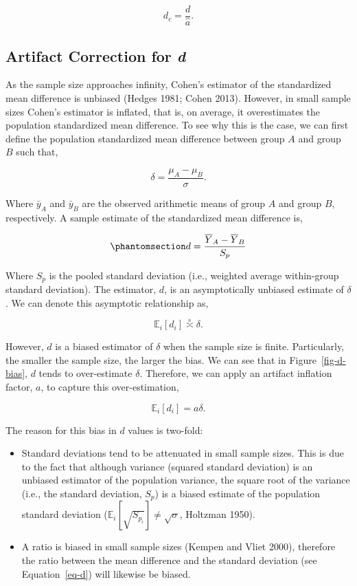 \documentclass[
  letterpaper,
  DIV=11,
  numbers=noendperiod]{scrreprt}
\providecommand{\tightlist}{%
  \setlength{\itemsep}{0pt}\setlength{\parskip}{0pt}}\usepackage{longtable,booktabs,array}
\begin{document}
\[
d_c = \frac{d}{\hat{a}}.
\]

\subsection{\texorpdfstring{Artifact Correction for
\emph{d}}{Artifact Correction for d}}\label{artifact-correction-for-d}

As the sample size approaches infinity, Cohen's estimator of the
standardized mean difference is unbiased (Hedges 1981; Cohen 2013).
However, in small sample sizes Cohen's estimator is inflated, that is,
on average, it overestimates the population standardized mean
difference. To see why this is the case, we can first define the
population standardized mean difference between group \(A\) and group
\(B\) such that,

\[
\delta = \frac{\mu_A-\mu_B}{\sigma}.
\]

Where \(\bar{y}_A\) and \(\bar{y}_B\) are the observed arithmetic means
of group \(A\) and group \(B\), respectively. A sample estimate of the
standardized mean difference is,

\begin{equation}\phantomsection\label{eq-d}{
d = \frac{\overline{Y}_A-\overline{Y}_B}{S_p}
}\end{equation}

Where \(S_p\) is the pooled standard deviation (i.e., weighted average
within-group standard deviation). The estimator, \(d\), is an
asymptotically unbiased estimate of \(\delta\). We can denote this
asymptotic relationship as,

\[
\mathbb{E}_i[d_i] \overset{_n}{\asymp} \delta.
\]

However, \(d\) is a biased estimator of \(\delta\) when the sample size
is finite. Particularly, the smaller the sample size, the larger the
bias. We can see that in Figure~\ref{fig-d-bias}, \(d\) tends to
over-estimate \(\delta\). Therefore, we can apply an artifact inflation
factor, \(a\), to capture this over-estimation,

\[
\mathbb{E}_i[d_i] = a\delta.
\]

The reason for this bias in \(d\) values is two-fold:

\begin{itemize}
\tightlist
\item
  Standard deviations tend to be attenuated in small sample sizes. This
  is due to the fact that although variance (squared standard deviation)
  is an unbiased estimator of the population variance, the square root
  of the variance (i.e., the standard deviation, \(S_p\)) is a biased
  estimate of the population standard deviation
  (\(\mathbb{E}_i[\sqrt{S_{p_i}}] \neq \sqrt{\sigma}\), Holtzman 1950).
\item
  A ratio is biased in small sample sizes (Kempen and Vliet 2000),
  therefore the ratio between the mean difference and the standard
  deviation (see Equation~\ref{eq-d}) will likewise be biased.
\end{itemize}
\end{document}
